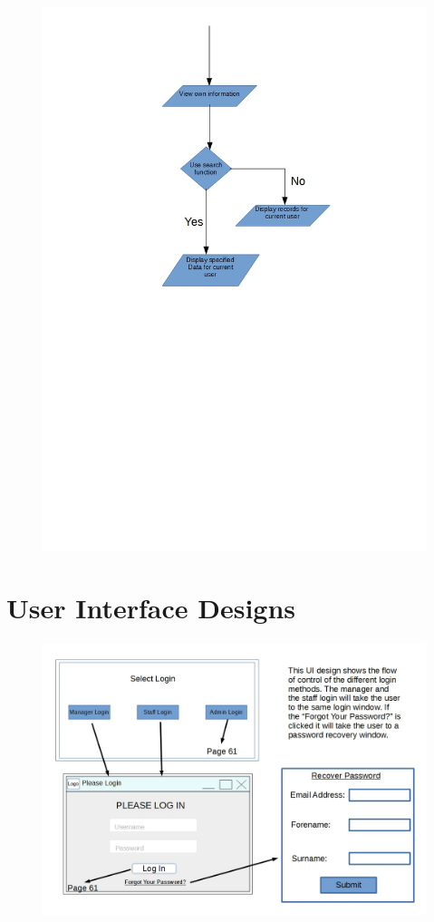 \begin{figure}[H]
\includegraphics[width=\textwidth]{FlowchartPart5.jpg}
\end{figure}



\section{User Interface Designs}

\begin{figure}[H]
\includegraphics[width=\textwidth,angle=90]{GUI_Design1.jpg}
\caption{}
\end{figure}



